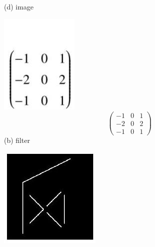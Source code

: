 \documentclass[10pt]{article}
\begin{document}
(d) image

\includegraphics[max width=\textwidth]{2022_01_06_b5ce182ed1bd5f482e5bg-18(2)}
$$
\left(\begin{array}{lll}
-1 & 0 & 1 \\
-2 & 0 & 2 \\
-1 & 0 & 1
\end{array}\right)
$$
(b) filter

\includegraphics[max width=\textwidth]{2022_01_06_b5ce182ed1bd5f482e5bg-18(3)}
\end{document}
